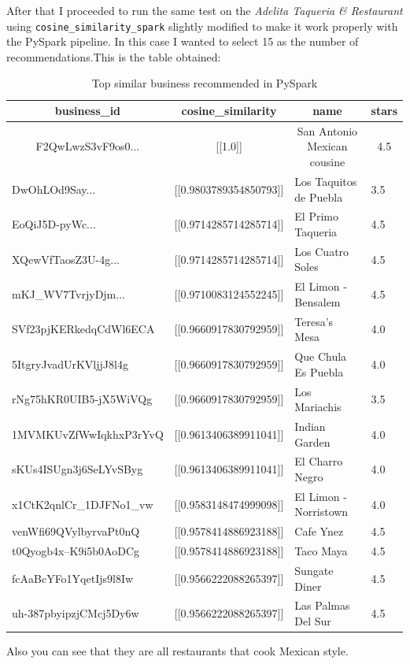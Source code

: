 \documentclass[12pt,english]{report}
\begin{document}
After that I proceeded to run the same test on the \textit{Adelita Taqueria \& Restaurant} using \texttt{cosine\_similarity\_spark} slightly modified to make it work properly with the PySpark pipeline.
In this case I wanted to select 15 as the number of recommendations.This is the table obtained:\par
\begin{table}[h]
\caption{Top similar business recommended in PySpark}
\begin{tabular}{|l|l|l|l|}
\hline
\multicolumn{1}{|c|}{business\_id}            & \multicolumn{1}{c|}{cosine\_similarity} & \multicolumn{1}{c|}{name}                        & \multicolumn{1}{c|}{stars} \\ \hline
\multicolumn{1}{|c|}{F2QwLwzS3vF9os0...} & \multicolumn{1}{c|}{{[}{[}1.0{]}{]}}    & \multicolumn{1}{c|}{San Antonio Mexican cousine} & \multicolumn{1}{c|}{4.5}   \\ \hline
DwOhLOd9Say...   & {[}{[}0.9803789354850793{]}{]} & Los Taquitos de Puebla & 3.5 \\ \hline
EoQiJ5D-pyWc...  & {[}{[}0.9714285714285714{]}{]} & El Primo Taqueria      & 4.5 \\ \hline
XQewVfTaosZ3U-4g...  & {[}{[}0.9714285714285714{]}{]} & Los Cuatro Soles       & 4.5 \\ \hline
mKJ\_WV7TvrjyDjm... & {[}{[}0.9710083124552245{]}{]} & El Limon - Bensalem    & 4.5 \\ \hline
SVf23pjKERkedqCdWl6ECA   & {[}{[}0.9660917830792959{]}{]} & Teresa's Mesa          & 4.0 \\ \hline
5ItgryJvadUrKVljjJ8l4g   & {[}{[}0.9660917830792959{]}{]} & Que Chula Es Puebla    & 4.0 \\ \hline
rNg75hKR0UIB5-jX5WiVQg   & {[}{[}0.9660917830792959{]}{]} & Los Mariachis          & 3.5 \\ \hline
1MVMKUvZfWwIqkhxP3rYvQ   & {[}{[}0.9613406389911041{]}{]} & Indian Garden          & 4.0 \\ \hline
sKUs4ISUgn3j6SeLYvSByg   & {[}{[}0.9613406389911041{]}{]} & El Charro Negro        & 4.0 \\ \hline
x1CtK2qnlCr\_1DJFNo1\_vw & {[}{[}0.9583148474999098{]}{]} & El Limon - Norristown  & 4.0 \\ \hline
venWfi69QVylbyrvaPt0nQ   & {[}{[}0.9578414886923188{]}{]} & Cafe Ynez              & 4.5 \\ \hline
t0Qyogb4x--K9i5b0AoDCg   & {[}{[}0.9578414886923188{]}{]} & Taco Maya              & 4.5 \\ \hline
fcAaBcYFo1YqetIjs9l8Iw   & {[}{[}0.9566222088265397{]}{]} & Sungate Diner          & 4.5 \\ \hline
uh-387pbyipzjCMcj5Dy6w   & {[}{[}0.9566222088265397{]}{]} & Las Palmas Del Sur     & 4.5 \\ \hline
\end{tabular}
\end{table}
Also you can see that they are all restaurants that cook Mexican style.
\end{document}
